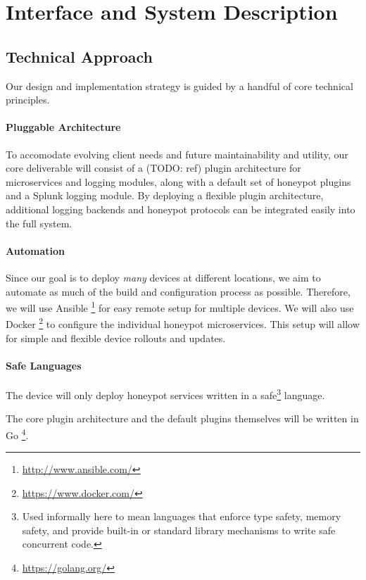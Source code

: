 \chapter{Interface and System Description}

\section{Technical Approach}

Our design and implementation strategy is guided by a handful of core
technical principles.

\subsubsection{Pluggable Architecture}

To accomodate evolving client needs and future maintainability and utility,
our core deliverable will consist of a (TODO: ref) plugin architecture
for microservices and logging modules, along with a default set of honeypot
plugins and a Splunk logging module. By deploying a flexible plugin
architecture, additional logging backends and honeypot protocols can be
integrated easily into the full system.

\subsubsection{Automation}

Since our goal is to deploy \textit{many} devices at different
locations, we aim to automate as much of the build and configuration process
as possible. Therefore, we will use Ansible
\footnote{\url{http://www.ansible.com/}} for easy remote setup for
multiple devices. We will also use Docker
\footnote{\url{https://www.docker.com/}} to configure the individual
honeypot microservices. This setup will allow for simple and flexible device
rollouts and updates.

\subsubsection{Safe Languages}

The device will only deploy honeypot services written in a
safe\footnote{Used informally here to mean languages that enforce type
safety, memory safety, and provide built-in or standard library mechanisms to
write safe concurrent code.} language.

The core plugin architecture and the default plugins themselves will be written
in Go \footnote{\url{https://golang.org/}}.

